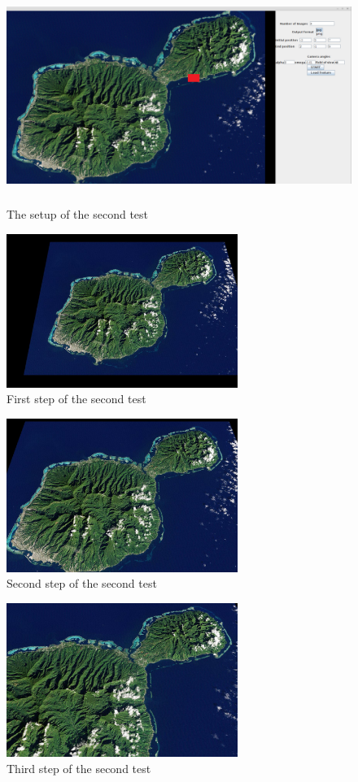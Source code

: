 \documentclass[english,12pt,a4paper,pdftex,elec,utf8]{aaltothesis}
\begin{document}
\begin{figure}[htb]
\centering \includegraphics[height=7cm]{screenTest2.png}
\caption{The setup of the second test\label{screenTest2}}
\end{figure}

\begin{figure}[htb]
\centering \includegraphics[height=5cm]{screenshot0.jpg}
\caption{First step of the second test\label{screenshot0Test2}}
\end{figure}

\begin{figure}[htb]
\centering \includegraphics[height=5cm]{screenshot1.jpg}
\caption{Second step of the second test\label{screenshot1Test2}}
\end{figure}

\begin{figure}[htb]
\centering \includegraphics[height=5cm]{screenshot2.jpg}
\caption{Third step of the second test\label{screenshot2Test2}}
\end{figure}
\end{document}
